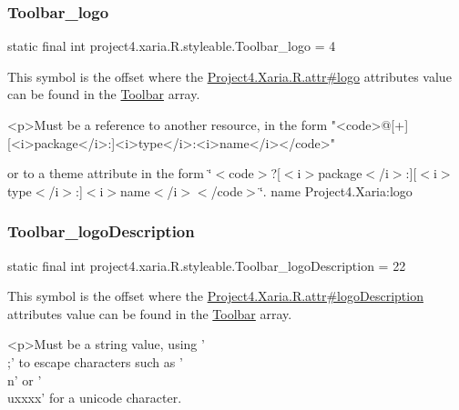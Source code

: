 \subsubsection{\texorpdfstring{Toolbar\+\_\+logo}{Toolbar\_logo}}
{\footnotesize\ttfamily static final int project4.\+xaria.\+R.\+styleable.\+Toolbar\+\_\+logo = 4\hspace{0.3cm}{\ttfamily [static]}}

This symbol is the offset where the \hyperlink{}{Project4.\+Xaria.\+R.\+attr\#logo} attribute\textquotesingle{}s value can be found in the \hyperlink{classproject4_1_1xaria_1_1R_1_1styleable_af6c30f9e9e086f6bf4e510669443fa59}{Toolbar} array.

\begin{DoxyVerb}      <p>Must be a reference to another resource, in the form "<code>@[+][<i>package</i>:]<i>type</i>:<i>name</i></code>"
\end{DoxyVerb}
 or to a theme attribute in the form \char`\"{}$<$code$>$?\mbox{[}$<$i$>$package$<$/i$>$\+:\mbox{]}\mbox{[}$<$i$>$type$<$/i$>$\+:\mbox{]}$<$i$>$name$<$/i$>$$<$/code$>$\char`\"{}.  name Project4.\+Xaria\+:logo \mbox{\label{classproject4_1_1xaria_1_1R_1_1styleable_ac4c21d9b696d419fa766694469674d1f}} 
\subsubsection{\texorpdfstring{Toolbar\+\_\+logo\+Description}{Toolbar\_logoDescription}}
{\footnotesize\ttfamily static final int project4.\+xaria.\+R.\+styleable.\+Toolbar\+\_\+logo\+Description = 22\hspace{0.3cm}{\ttfamily [static]}}

This symbol is the offset where the \hyperlink{}{Project4.\+Xaria.\+R.\+attr\#logo\+Description} attribute\textquotesingle{}s value can be found in the \hyperlink{classproject4_1_1xaria_1_1R_1_1styleable_af6c30f9e9e086f6bf4e510669443fa59}{Toolbar} array.

\begin{DoxyVerb}      <p>Must be a string value, using '\\;' to escape characters such as '\\n' or '\\uxxxx' for a unicode character.
\end{DoxyVerb}
 

